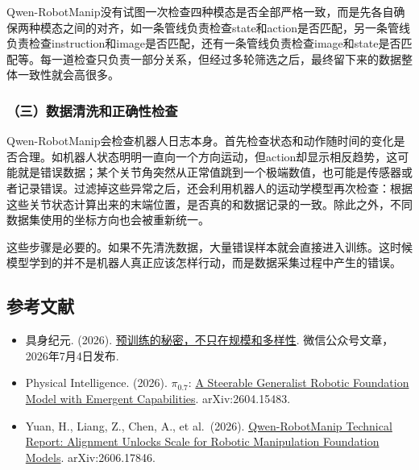 Qwen-RobotManip没有试图一次检查四种模态是否全部严格一致，而是先各自确保两种模态之间的对齐，如一条管线负责检查state和action是否匹配，另一条管线负责检查instruction和image是否匹配，还有一条管线负责检查image和state是否匹配等。每一道检查只负责一部分关系，但经过多轮筛选之后，最终留下来的数据整体一致性就会高很多。

\hypertarget{ux4e09ux6570ux636eux6e05ux6d17ux548cux6b63ux786eux6027ux68c0ux67e5}{%
\subsubsection{（三）数据清洗和正确性检查}\label{ux4e09ux6570ux636eux6e05ux6d17ux548cux6b63ux786eux6027ux68c0ux67e5}}

Qwen-RobotManip会检查机器人日志本身。首先检查状态和动作随时间的变化是否合理。如机器人状态明明一直向一个方向运动，但action却显示相反趋势，这可能就是错误数据；某个关节角突然从正常值跳到一个极端数值，也可能是传感器或者记录错误。过滤掉这些异常之后，还会利用机器人的运动学模型再次检查：根据这些关节状态计算出来的末端位置，是否真的和数据记录的一致。除此之外，不同数据集使用的坐标方向也会被重新统一。

这些步骤是必要的。如果不先清洗数据，大量错误样本就会直接进入训练。这时候模型学到的并不是机器人真正应该怎样行动，而是数据采集过程中产生的错误。

\hypertarget{ux53c2ux8003ux6587ux732e-165}{%
\subsection{参考文献}\label{ux53c2ux8003ux6587ux732e-165}}

\vspace{0.25em}
\begin{itemize}
\tightlist
\item
  具身纪元. (2026). \href{https://www.jintiankansha.com/t/8QXVctCOWG}{预训练的秘密，不只在规模和多样性}. 微信公众号文章，2026年7月4日发布.
\item
  Physical Intelligence. (2026). \(\pi_{0.7}\): \href{https://arxiv.org/abs/2604.15483}{A Steerable Generalist Robotic Foundation Model with Emergent Capabilities}. arXiv:2604.15483.
\item
  Yuan, H., Liang, Z., Chen, A., et al.~(2026). \href{https://arxiv.org/abs/2606.17846}{Qwen-RobotManip Technical Report: Alignment Unlocks Scale for Robotic Manipulation Foundation Models}. arXiv:2606.17846.
\end{itemize}

\clearpage
